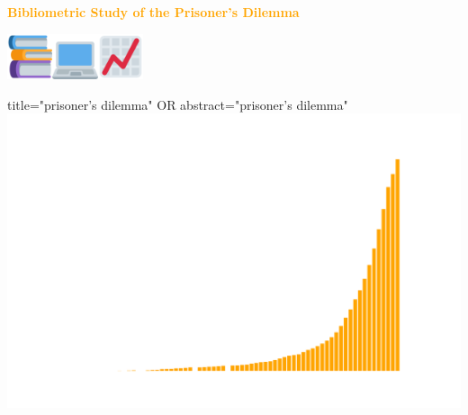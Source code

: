 \documentclass{beamer}
\begin{document}
\begin{frame}
    \begin{center}
    
    \end{center}
\end{frame}

\begin{frame}
    \begin{center}
    \textcolor{orange}{\large{\textbf{Bibliometric Study of the Prisoner's Dilemma}}} \vspace{1cm}
    
    \includegraphics[width=0.10\textwidth]{static/books.png}\hspace{2pt}\includegraphics[width=0.10\textwidth]{static/pc.png}\hspace{2pt}\includegraphics[width=0.10\textwidth]{static/chart.png}
    \end{center}
\end{frame}

\begin{frame}
    \begin{center}
    
    \end{center}
\end{frame}

\begin{frame}
    \begin{center}
    \small{title="prisoner's dilemma" OR abstract="prisoner's dilemma"}\\
    
    \vspace{-.50cm}
    \includegraphics[width=\textwidth]{static/articles.png}
    \end{center}
\end{frame}
\end{document}
